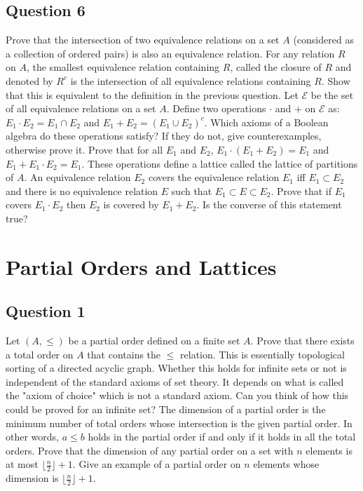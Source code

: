 \documentclass[12pt]{report}
\begin{document}
\section*{Question 6}
Prove that the intersection of two equivalence relations on a set $A$ (considered as a collection of ordered pairs) is also an equivalence relation. For any relation $R$ on $A$, the smallest equivalence relation containing $R$, called the closure of $R$ and denoted by $R^{c}$ is the intersection of all equivalence relations containing $R$. Show that this is equivalent to the definition in the previous question. Let $\mathcal{E}$ be the set of all equivalence relations on a set $A$. Define two operations $\cdot$ and $+$ on $\mathcal{E}$ as: $E_{1}\cdot E_{2} = E_{1} \cap E_{2}$ and $E_{1} + E_{2} = (E_{1} \cup E_{2})^{c}$. Which axioms of a Boolean algebra do these operations satisfy? If they do not, give counterexamples, otherwise prove it. Prove that for all $E_{1}$ and $E_{2}$, $E_{1}\cdot(E_{1} + E_{2}) = E_{1}$ and $E_{1} + E_{1}\cdot E_{2} = E_{1}$. These operations define a lattice called the lattice of partitions of $A$. An equivalence relation $E_{2}$ covers the equivalence relation $E_{1}$ iff $E_{1} \subset E_{2}$ and there is no equivalence relation $E$ such that $E_{1} \subset E \subset E_{2}$. Prove that if $E_{1}$ covers $E_{1}\cdot E_{2}$ then $E_{2}$ is covered by $E_{1} + E_{2}$. Is the converse of this statement true?  
\chapter{Partial Orders and Lattices}
\section*{Question 1}
Let $(A, \leq)$ be a partial order defined on a finite set $A$. Prove that there exists a total order on $A$ that contains the $\leq$ relation. This is essentially topological sorting of a directed acyclic graph.  Whether this holds for infinite sets or not is independent of the standard axioms of set theory. It depends on what is called the "axiom of choice" which is not a standard axiom. Can you think of how this could be proved for an infinite set? The dimension of a partial order is the minimum number of total orders whose intersection is the given partial order. In other words, $a \leq b$ holds in the partial order if and only if it holds in all the total orders. Prove that the dimension of any partial order on a set with $n$ elements is at most $\lfloor \frac{n}{2} \rfloor + 1$. Give an example of a partial order on $n$ elements whose dimension is $\lfloor \frac{n}{2} \rfloor + 1$.
\end{document}
